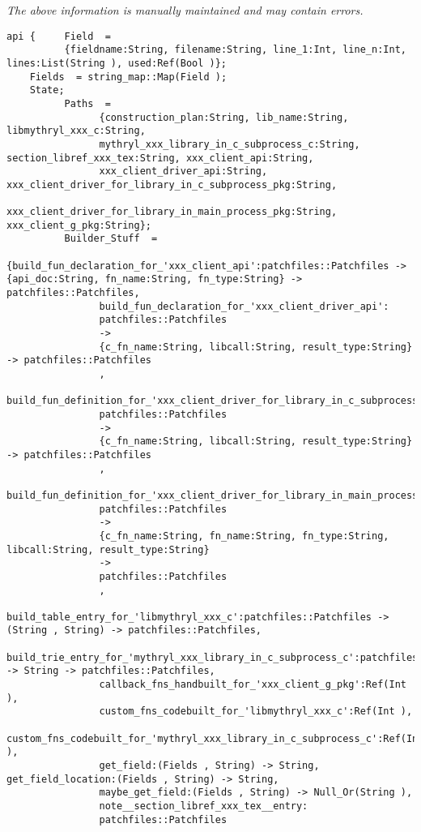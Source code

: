\label{api:Make\_Library\_Glue}

{\tiny \it The above information is manually maintained and may contain errors.}
\begin{verbatim}
api {     Field  =
          {fieldname:String, filename:String, line_1:Int, line_n:Int, lines:List(String ), used:Ref(Bool )};
    Fields  = string_map::Map(Field );
    State;
          Paths  =
                {construction_plan:String, lib_name:String, libmythryl_xxx_c:String,
                mythryl_xxx_library_in_c_subprocess_c:String, section_libref_xxx_tex:String, xxx_client_api:String,
                xxx_client_driver_api:String, xxx_client_driver_for_library_in_c_subprocess_pkg:String,
                xxx_client_driver_for_library_in_main_process_pkg:String, xxx_client_g_pkg:String};
          Builder_Stuff  =
                {build_fun_declaration_for_'xxx_client_api':patchfiles::Patchfiles -> {api_doc:String, fn_name:String, fn_type:String} -> patchfiles::Patchfiles,
                build_fun_declaration_for_'xxx_client_driver_api':
                patchfiles::Patchfiles
                ->
                {c_fn_name:String, libcall:String, result_type:String} -> patchfiles::Patchfiles
                ,
                build_fun_definition_for_'xxx_client_driver_for_library_in_c_subprocess_pkg':
                patchfiles::Patchfiles
                ->
                {c_fn_name:String, libcall:String, result_type:String} -> patchfiles::Patchfiles
                ,
                build_fun_definition_for_'xxx_client_driver_for_library_in_main_process_pkg':
                patchfiles::Patchfiles
                ->
                {c_fn_name:String, fn_name:String, fn_type:String, libcall:String, result_type:String}
                ->
                patchfiles::Patchfiles
                ,
                build_table_entry_for_'libmythryl_xxx_c':patchfiles::Patchfiles -> (String , String) -> patchfiles::Patchfiles,
                build_trie_entry_for_'mythryl_xxx_library_in_c_subprocess_c':patchfiles::Patchfiles -> String -> patchfiles::Patchfiles,
                callback_fns_handbuilt_for_'xxx_client_g_pkg':Ref(Int ),
                custom_fns_codebuilt_for_'libmythryl_xxx_c':Ref(Int ),
                custom_fns_codebuilt_for_'mythryl_xxx_library_in_c_subprocess_c':Ref(Int ),
                get_field:(Fields , String) -> String, get_field_location:(Fields , String) -> String,
                maybe_get_field:(Fields , String) -> Null_Or(String ),
                note__section_libref_xxx_tex__entry:
                patchfiles::Patchfiles

\end{verbatim}
